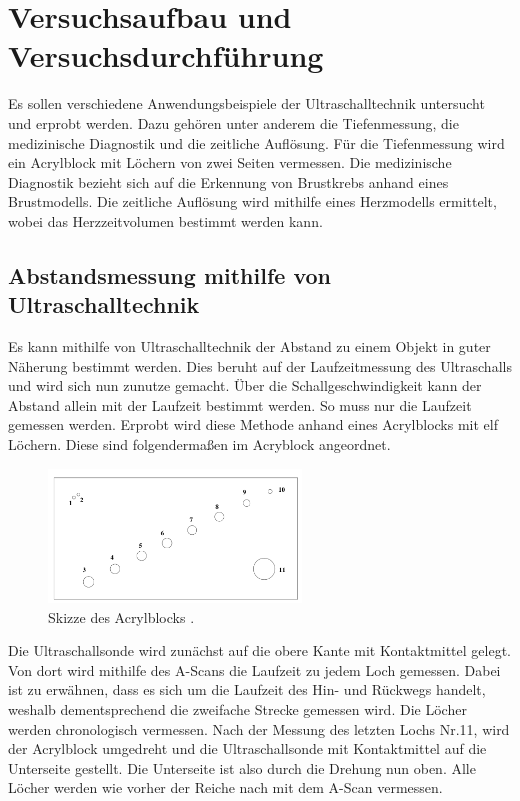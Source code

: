 %

%
\section{Versuchsaufbau und Versuchsdurchführung}
\label{sec:Durchfuehrung}

Es sollen verschiedene Anwendungsbeispiele der Ultraschalltechnik untersucht und erprobt werden.
Dazu gehören unter anderem die Tiefenmessung, die medizinische Diagnostik und die zeitliche Auflösung.
Für die Tiefenmessung wird ein Acrylblock mit Löchern von zwei Seiten vermessen. Die medizinische 
Diagnostik bezieht sich auf die Erkennung von Brustkrebs anhand eines Brustmodells. Die zeitliche 
Auflösung wird mithilfe eines Herzmodells ermittelt, wobei das Herzzeitvolumen bestimmt werden kann.

\subsection{Abstandsmessung mithilfe von Ultraschalltechnik}
Es kann mithilfe von Ultraschalltechnik der Abstand zu einem Objekt in guter Näherung bestimmt werden. 
Dies beruht auf der Laufzeitmessung des Ultraschalls und wird sich nun zunutze gemacht. Über die 
Schallgeschwindigkeit kann der Abstand allein mit der Laufzeit bestimmt werden. So muss nur die 
Laufzeit gemessen werden. Erprobt wird diese Methode anhand eines Acrylblocks mit elf Löchern. Diese 
sind folgendermaßen im Acryblock angeordnet.

\begin{figure}[H]
    \centering
    \includegraphics[width=0.6\textwidth]{content/Acrylblock.png}
    \caption{Skizze des Acrylblocks \cite{Versuchsanleitung_US2}.}
    \label{fig:Acryblock}
\end{figure}

\noindent Die Ultraschallsonde wird zunächst auf die obere Kante mit Kontaktmittel gelegt. Von dort wird mithilfe 
des A-Scans die Laufzeit zu jedem Loch gemessen. Dabei ist zu erwähnen, dass es sich um die Laufzeit 
des Hin- und Rückwegs handelt, weshalb dementsprechend die zweifache Strecke gemessen wird. Die Löcher werden 
chronologisch vermessen. Nach der Messung des letzten Lochs Nr.11, wird der Acrylblock umgedreht 
und die Ultraschallsonde mit Kontaktmittel auf die Unterseite gestellt. Die Unterseite ist also durch 
die Drehung nun oben. Alle Löcher werden wie vorher der Reiche nach mit dem A-Scan vermessen. \\

